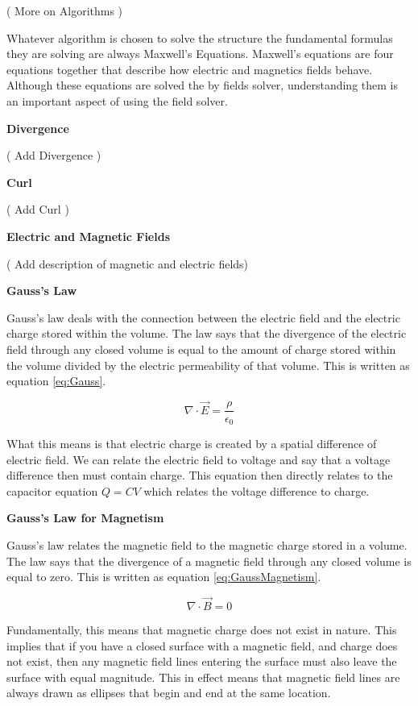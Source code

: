 \documentclass{book}
\begin{document}
( More on Algorithms )

Whatever algorithm is chosen to solve the structure the fundamental formulas they are solving are always Maxwell's Equations\cite{maxwells}.  Maxwell's equations are four equations together that describe how electric and magnetics fields behave.  Although these equations are solved the by fields solver, understanding them is an important aspect of using the field solver.  

\textbf{Divergence}

( Add Divergence )

\textbf{Curl}

( Add Curl )

\textbf{Electric and Magnetic Fields}

( Add description of magnetic and electric fields)

\textbf{Gauss's Law}

Gauss's law deals with the connection between the electric field and the electric charge stored within the volume.  The law says that the divergence of the electric field through any closed volume is equal to the amount of charge stored within the volume divided by the electric permeability of that volume.  This is written as equation \ref{eq:Gauss}.

\begin{equation} \label{eq:Gauss}
\nabla \cdot \vec{E}=\frac{\rho}{\epsilon_{0}} 
\end{equation}

What this means is that electric charge is created by a spatial difference of electric field.  We can relate the electric field to voltage and say that a voltage difference then must contain charge.  This equation then directly relates to the capacitor equation $Q=CV$ which relates the voltage difference to charge. 

\textbf{Gauss's Law for Magnetism}

Gauss's law relates the magnetic field to the magnetic charge stored in a volume.  The law says that the divergence of a magnetic field through any closed volume is equal to zero.  This is written as equation \ref{eq:GaussMagnetism}.

\begin{equation} \label{eq:GaussMagnetism}
\nabla \cdot \vec{B}=0
\end{equation}


Fundamentally, this means that magnetic charge does not exist in nature.  This implies that if you have a closed surface with a magnetic field, and charge does not exist, then any magnetic field lines entering the surface must also leave the surface with equal magnitude.  This in effect means that magnetic field lines are always drawn as ellipses that begin and end at the same location.  
\end{document}
